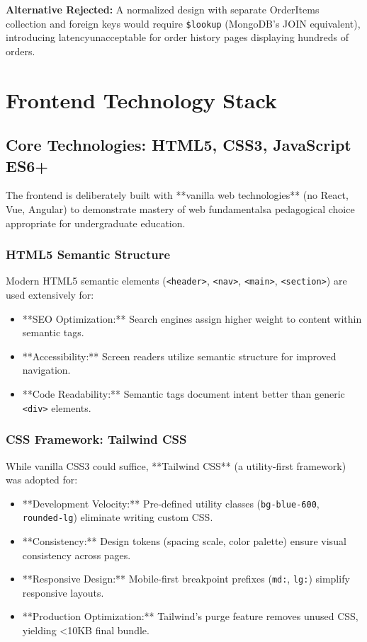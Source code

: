 \documentclass[12pt, a4paper]{report}
\begin{document}
\textbf{Alternative Rejected:} A normalized design with separate OrderItems collection and foreign keys would require \texttt{\$lookup} (MongoDB's JOIN equivalent), introducing latencyunacceptable for order history pages displaying hundreds of orders.

\section{Frontend Technology Stack}

\subsection{Core Technologies: HTML5, CSS3, JavaScript ES6+}

The frontend is deliberately built with **vanilla web technologies** (no React, Vue, Angular) to demonstrate mastery of web fundamentalsa pedagogical choice appropriate for undergraduate education.

\subsubsection{HTML5 Semantic Structure}

Modern HTML5 semantic elements (\texttt{<header>}, \texttt{<nav>}, \texttt{<main>}, \texttt{<section>}) are used extensively for:

\begin{itemize}
    \item **SEO Optimization:** Search engines assign higher weight to content within semantic tags.
    \item **Accessibility:** Screen readers utilize semantic structure for improved navigation.
    \item **Code Readability:** Semantic tags document intent better than generic \texttt{<div>} elements.
\end{itemize}

\subsubsection{CSS Framework: Tailwind CSS}

While vanilla CSS3 could suffice, **Tailwind CSS** (a utility-first framework) was adopted for:

\begin{itemize}
    \item **Development Velocity:** Pre-defined utility classes (\texttt{bg-blue-600}, \texttt{rounded-lg}) eliminate writing custom CSS.
    \item **Consistency:** Design tokens (spacing scale, color palette) ensure visual consistency across pages.
    \item **Responsive Design:** Mobile-first breakpoint prefixes (\texttt{md:}, \texttt{lg:}) simplify responsive layouts.
    \item **Production Optimization:** Tailwind's purge feature removes unused CSS, yielding \textless10KB final bundle.
\end{itemize}
\end{document}
